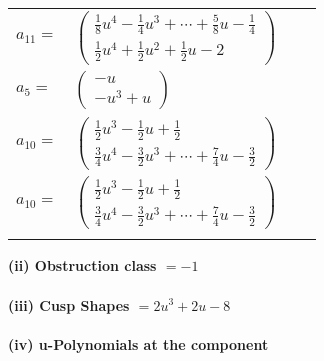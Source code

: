 \documentclass[1p]{elsarticle_modified}
\theoremstyle{definition}
\begin{document}
\begin{tabular}{m{7pt} m{180pt} m{7pt} m{180pt} }
\flushright $a_{11}=$&$\begin{pmatrix}\frac{1}{8} u^4-\frac{1}{4} u^3+\cdots+\frac{5}{8} u-\frac{1}{4}\\\frac{1}{2} u^4+\frac{1}{2} u^2+\frac{1}{2} u-2\end{pmatrix}$ \\
\flushright $a_{5}=$&$\begin{pmatrix}- u\\- u^3+u\end{pmatrix}$ \\
\flushright $a_{10}=$&$\begin{pmatrix}\frac{1}{2} u^3-\frac{1}{2} u+\frac{1}{2}\\\frac{3}{4} u^4-\frac{3}{2} u^3+\cdots+\frac{7}{4} u-\frac{3}{2}\end{pmatrix}$\\ \flushright $a_{10}=$&$\begin{pmatrix}\frac{1}{2} u^3-\frac{1}{2} u+\frac{1}{2}\\\frac{3}{4} u^4-\frac{3}{2} u^3+\cdots+\frac{7}{4} u-\frac{3}{2}\end{pmatrix}$\\&\end{tabular}
\flushleft \textbf{(ii) Obstruction class $= -1$}\\~\\
\flushleft \textbf{(iii) Cusp Shapes $= 2 u^3+2 u-8$}\\~\\
\newpage\renewcommand{\arraystretch}{1}
\flushleft \textbf{(iv) u-Polynomials at the component}\newline \\
\end{document}

